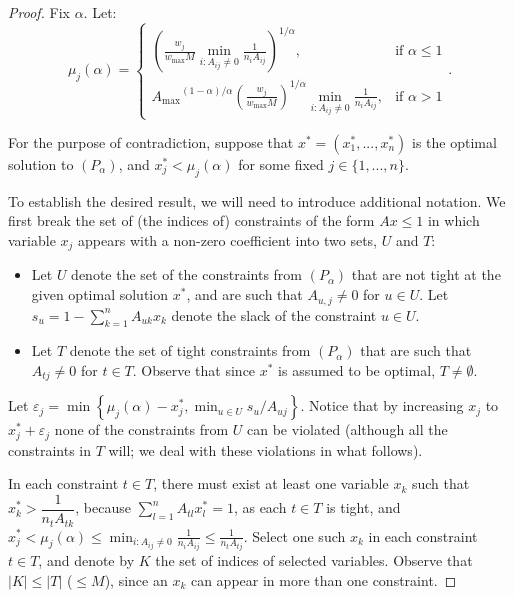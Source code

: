 \documentclass[11pt]{article}
\begin{document}
\begin{proof}
Fix $\alpha$. Let:
\begin{equation*}\mu_j({\alpha}) = 
\begin{cases} \left(\frac{w_j}{w_{\max}M}\min_{i: A_{ij}\neq 0}\frac{1}{n_i A_{ij}}\right)^{1/\alpha}, & \mbox{if } \alpha\leq 1 \\
{{A_{\max}}}^{(1-\alpha)/\alpha}\left(\frac{w_j}{w_{\max}M}\right)^{1/\alpha}\min_{i: A_{ij}\neq 0}\frac{1}{n_i A_{ij}}, & \mbox{if } \alpha> 1 \end{cases}.
\end{equation*}

For the purpose of contradiction, suppose that $x^* = (x_1^*,...,x_n^*)$ is the optimal solution to $(P_\alpha)$, and $x_j^* < \mu_j(\alpha)$ for some fixed $j\in\{1,...,n\}$.  

To establish the desired result, we will need to introduce additional notation. We first break the set of (the indices of) constraints of the form $Ax\leq 1$ in which variable $x_j$ appears with a non-zero coefficient into two sets, $U$ and $T$:
\begin{itemize}
\item Let $U$ denote the set of the constraints from $(P_\alpha)$ that are not tight at the given optimal solution $x^*$, and are such that $A_{u, j}\neq 0$ for $u\in U$. Let $s_u = {1-\sum_{k=1}^n A_{uk}x_k}$ denote the slack of the constraint $u\in U$.
\item Let $T$ denote the set of tight constraints from $(P_\alpha)$ that are such that $A_{tj}\neq 0$ for $t\in T$. Observe that since $x^*$ is assumed to be optimal, $T\neq \emptyset$.
\end{itemize}

Let $\varepsilon_j = \min\left\{\mu_j(\alpha)-x_j^*, \min_{u\in U}s_u/A_{uj}\right\}$. Notice that by increasing $x_j$ to $x_j^* + \varepsilon_j$ none of the constraints from $U$ can be violated (although all the constraints in $T$ will; we deal with these violations in what follows).

In each constraint $t\in T$, there must exist at least one variable $x_k$ such that $x_k^*>\dfrac{1}{n_tA_{tk}}$, because $\sum_{l=1}^n A_{tl} x_{l}^*=1$, as each $t\in T$ is tight, and $
x_j^*<\mu_j(\alpha)\leq\min_{i: A_{ij}\neq 0}\frac{1}{n_i A_{ij}}\leq \frac{1}{n_t A_{tj}}.
$
Select one such $x_k$ in each constraint $t\in T$, and denote by $K$ the set of indices of selected variables. Observe that $|K|\leq |T|$ ($\leq M$), since an $x_k$ can appear in more than one constraint. 


\end{proof}
\end{document}

